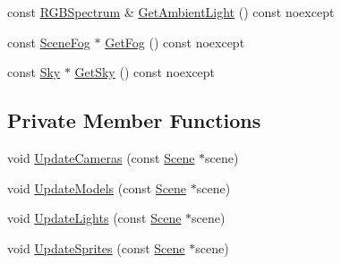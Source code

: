 \begin{DoxyCompactItemize}
\item 
const \hyperlink{structmage_1_1_r_g_b_spectrum}{R\+G\+B\+Spectrum} \& \hyperlink{structmage_1_1_pass_buffer_a91cbe609833b84c12113c9676b9de903}{Get\+Ambient\+Light} () const noexcept
\item 
const \hyperlink{classmage_1_1_scene_fog}{Scene\+Fog} $\ast$ \hyperlink{structmage_1_1_pass_buffer_a406b7dcb655d3689f0a4400edc2e9bf8}{Get\+Fog} () const noexcept
\item 
const \hyperlink{structmage_1_1_sky}{Sky} $\ast$ \hyperlink{structmage_1_1_pass_buffer_af6355cb9bd927f53bb93347348f21a11}{Get\+Sky} () const noexcept
\end{DoxyCompactItemize}
\subsection*{Private Member Functions}
\begin{DoxyCompactItemize}
\item 
void \hyperlink{structmage_1_1_pass_buffer_a1ded2ce7cadbcb176aec69a85ba81c3e}{Update\+Cameras} (const \hyperlink{classmage_1_1_scene}{Scene} $\ast$scene)
\item 
void \hyperlink{structmage_1_1_pass_buffer_a02d68f950566e8283d3fc74bdf19b66a}{Update\+Models} (const \hyperlink{classmage_1_1_scene}{Scene} $\ast$scene)
\item 
void \hyperlink{structmage_1_1_pass_buffer_a91a779121ecb4c08605d3073c34674c9}{Update\+Lights} (const \hyperlink{classmage_1_1_scene}{Scene} $\ast$scene)
\item 
void \hyperlink{structmage_1_1_pass_buffer_a8301fd646965c627f29120f412078ca1}{Update\+Sprites} (const \hyperlink{classmage_1_1_scene}{Scene} $\ast$scene)
\end{DoxyCompactItemize}
